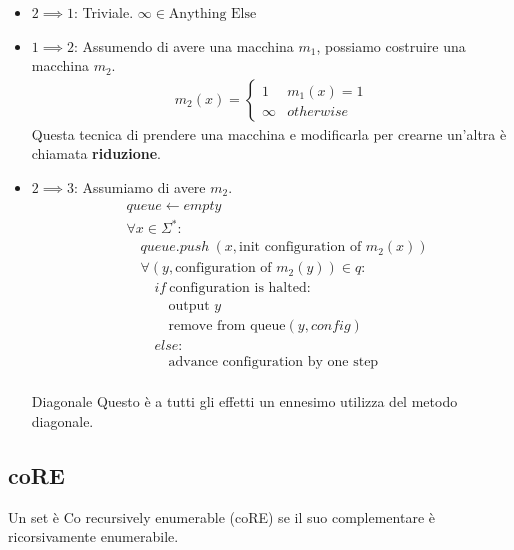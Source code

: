 \documentclass{article}
\begin{document}
\begin{itemize}
    \item $2\implies 1$: Triviale. $\infty\in\text{Anything Else}$
    \item $1\implies 2$: Assumendo di avere una macchina $m_1$, possiamo costruire una macchina $m_2$.
        \begin{align*}
            m_2(x) = \begin{cases}
                1 & m_1(x) = 1 \\
                \infty & otherwise
            \end{cases}
        \end{align*}
        Questa tecnica di prendere una macchina e modificarla per crearne un'altra è chiamata \textbf{riduzione}.
    \item $2\implies 3$: Assumiamo di avere $m_2$.
        \begin{align*}
            & queue \leftarrow empty \\
            & \forall x \in \Sigma^*: \\
            & \quad queue.push\ (x, \text{init configuration of }m_2(x)) \\
            & \quad \forall (y,\text{configuration of }m_2(y)) \in q: \\
            & \quad\quad if\ \text{configuration is halted}: \\
            & \quad\quad\quad \text{output }y \\
            & \quad\quad\quad \text{remove from queue} (y,config) \\
            & \quad\quad else: \\
            & \quad\quad\quad \text{advance configuration by one step} \\
        \end{align*}
        \begin{callout}{Diagonale}
            Questo è a tutti gli effetti un ennesimo utilizza del metodo diagonale.
        \end{callout}
\end{itemize}

\subsection{coRE}
Un set è Co recursively enumerable (coRE) se il suo complementare è ricorsivamente enumerabile.
\end{document}

